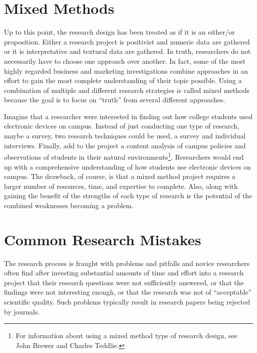 \section{Mixed Methods}

Up to this point, the research design has been treated as if it is an either/or proposition. Either a research project is positivist and numeric data are gathered or it is interpretative and textural data are gathered. In truth, researchers do not necessarily have to choose one approach over another. In fact, some of the most highly regarded business and marketing investigations combine approaches in an effort to gain the most complete understanding of their topic possible. Using a combination of multiple and different research strategies is called mixed methods because the goal is to focus on ``truth'' from several different approaches.

Imagine that a researcher were interested in finding out how college students used electronic devices on campus. Instead of just conducting one type of research, maybe a survey, two research techniques could be used, a survey and individual interviews. Finally, add to the project a content analysis of campus policies and observations of students in their natural environments\footnote{For information about using a mixed method type of research design, see John Brewer\cite{brewer1989multimethod} and Charles Teddlie\cite{teddlie2006general}.}. Researchers would end up with a comprehensive understanding of how students use electronic devices on campus. The drawback, of course, is that a mixed method project requires a larger number of resources, time, and expertise to complete. Also, along with gaining the benefit of the strengths of each type of research is the potential of the combined weaknesses becoming a problem.

\section{Common Research Mistakes}

The research process is fraught with problems and pitfalls and novice researchers often find after investing substantial amounts of time and effort into a research project that their research questions were not sufficiently answered, or that the findings were not interesting enough, or that the research was not of ``acceptable'' scientific quality. Such problems typically result in research papers being rejected by journals.

